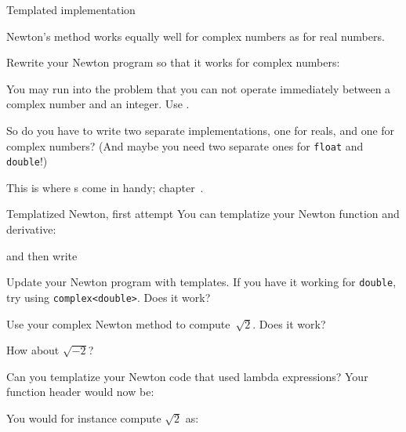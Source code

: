  {Templated implementation}
\label{sec:newton-template}

Newton's method works equally well for complex numbers as for real numbers.

\begin{exercise}
  \label{ex:newton-cplx}
  Rewrite your Newton program so that it works for complex numbers:

  You may run into the problem that
  you can not operate immediately between a complex number
  and an integer. Use .
\end{exercise}

So do you have to write two separate implementations, one for reals,
and one for complex numbers?
(And maybe you need two separate ones for \lstinline{float} and \lstinline{double}!)

This is where s come in handy; chapter~.
\begin{plainblock}{Templatized Newton, first attempt}
  \label{sl:newt-template}
  You can templatize your Newton function and derivative:

  and then write
\end{plainblock}

\begin{exercise}
  \label{ex:newt-template1}
  Update your Newton program with templates.
  If you have it working for \lstinline{double},
  try using \lstinline{complex<double>}.
  Does it work?
\end{exercise}

\begin{exercise}
  \label{ex:newt-template2}
  Use your complex Newton method to compute~$\sqrt 2$.
  Does it work?

  How about $\sqrt{-2}$?
\end{exercise}

\begin{exercise}
  \label{ex:newt-lambda-template}
  Can you templatize your Newton code that used lambda expressions?
  Your function header would now be:

  You would for instance compute $\sqrt 2$ as:
\end{exercise}

